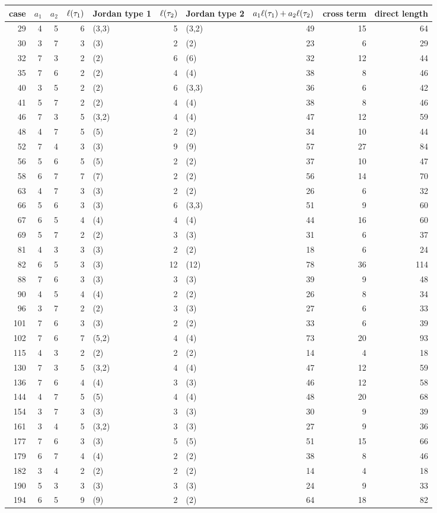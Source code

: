 \begin{tabular}{rrrrlrlrrr}
\toprule
case & $a_1$ & $a_2$ & $\ell(\tau_1)$ & Jordan type 1 & $\ell(\tau_2)$ & Jordan type 2 & $a_1\ell(\tau_1)+a_2\ell(\tau_2)$ & cross term & direct length\\
\midrule
29 & 4 & 5 & 6 & (3,3) & 5 & (3,2) & 49 & 15 & 64 \\
30 & 3 & 7 & 3 & (3) & 2 & (2) & 23 & 6 & 29 \\
32 & 7 & 3 & 2 & (2) & 6 & (6) & 32 & 12 & 44 \\
35 & 7 & 6 & 2 & (2) & 4 & (4) & 38 & 8 & 46 \\
40 & 3 & 5 & 2 & (2) & 6 & (3,3) & 36 & 6 & 42 \\
41 & 5 & 7 & 2 & (2) & 4 & (4) & 38 & 8 & 46 \\
46 & 7 & 3 & 5 & (3,2) & 4 & (4) & 47 & 12 & 59 \\
48 & 4 & 7 & 5 & (5) & 2 & (2) & 34 & 10 & 44 \\
52 & 7 & 4 & 3 & (3) & 9 & (9) & 57 & 27 & 84 \\
56 & 5 & 6 & 5 & (5) & 2 & (2) & 37 & 10 & 47 \\
58 & 6 & 7 & 7 & (7) & 2 & (2) & 56 & 14 & 70 \\
63 & 4 & 7 & 3 & (3) & 2 & (2) & 26 & 6 & 32 \\
66 & 5 & 6 & 3 & (3) & 6 & (3,3) & 51 & 9 & 60 \\
67 & 6 & 5 & 4 & (4) & 4 & (4) & 44 & 16 & 60 \\
69 & 5 & 7 & 2 & (2) & 3 & (3) & 31 & 6 & 37 \\
81 & 4 & 3 & 3 & (3) & 2 & (2) & 18 & 6 & 24 \\
82 & 6 & 5 & 3 & (3) & 12 & (12) & 78 & 36 & 114 \\
88 & 7 & 6 & 3 & (3) & 3 & (3) & 39 & 9 & 48 \\
90 & 4 & 5 & 4 & (4) & 2 & (2) & 26 & 8 & 34 \\
96 & 3 & 7 & 2 & (2) & 3 & (3) & 27 & 6 & 33 \\
101 & 7 & 6 & 3 & (3) & 2 & (2) & 33 & 6 & 39 \\
102 & 7 & 6 & 7 & (5,2) & 4 & (4) & 73 & 20 & 93 \\
115 & 4 & 3 & 2 & (2) & 2 & (2) & 14 & 4 & 18 \\
130 & 7 & 3 & 5 & (3,2) & 4 & (4) & 47 & 12 & 59 \\
136 & 7 & 6 & 4 & (4) & 3 & (3) & 46 & 12 & 58 \\
144 & 4 & 7 & 5 & (5) & 4 & (4) & 48 & 20 & 68 \\
154 & 3 & 7 & 3 & (3) & 3 & (3) & 30 & 9 & 39 \\
161 & 3 & 4 & 5 & (3,2) & 3 & (3) & 27 & 9 & 36 \\
177 & 7 & 6 & 3 & (3) & 5 & (5) & 51 & 15 & 66 \\
179 & 6 & 7 & 4 & (4) & 2 & (2) & 38 & 8 & 46 \\
182 & 3 & 4 & 2 & (2) & 2 & (2) & 14 & 4 & 18 \\
190 & 5 & 3 & 3 & (3) & 3 & (3) & 24 & 9 & 33 \\
194 & 6 & 5 & 9 & (9) & 2 & (2) & 64 & 18 & 82 \\
\bottomrule
\end{tabular}

